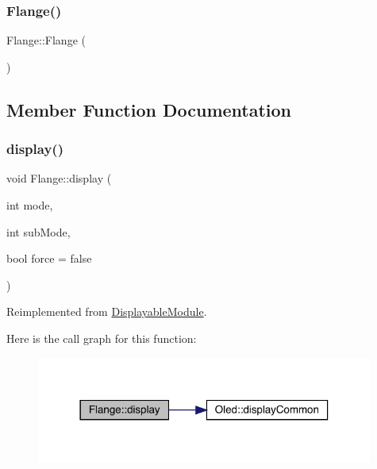 \subsubsection{\texorpdfstring{Flange()}{Flange()}}
{\footnotesize\ttfamily Flange\+::\+Flange (\begin{DoxyParamCaption}{ }\end{DoxyParamCaption})}



\subsection{Member Function Documentation}
\mbox{\label{class_flange_afce68b7e8538cf7bfacdcec8d603f602}} 
\subsubsection{\texorpdfstring{display()}{display()}}
{\footnotesize\ttfamily void Flange\+::display (\begin{DoxyParamCaption}\item[{int}]{mode,  }\item[{int}]{sub\+Mode,  }\item[{bool}]{force = {\ttfamily false} }\end{DoxyParamCaption})\hspace{0.3cm}{\ttfamily [virtual]}}



Reimplemented from \mbox{\hyperlink{class_displayable_module_a02de26d62ef508cae9ed07920e21784d}{Displayable\+Module}}.

Here is the call graph for this function\+:\nopagebreak
\begin{figure}[H]
\begin{center}
\leavevmode
\includegraphics[width=314pt]{class_flange_afce68b7e8538cf7bfacdcec8d603f602_cgraph}
\end{center}
\end{figure}
\mbox{\label{class_flange_a0b08351febfa39989acb6446c096346e}} 
